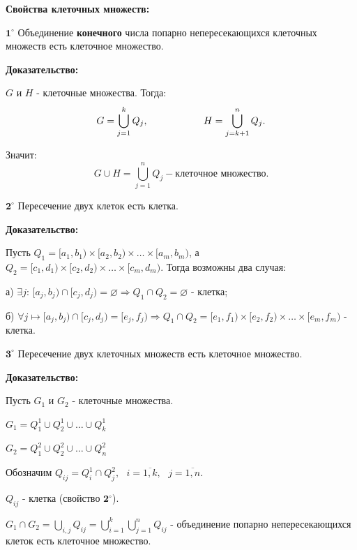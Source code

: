 \documentclass[a4paper,12pt]{article} %
\begin{document}
	\textbf{Свойства клеточных множеств:}
	
	$\textbf{1}^\circ$ Объединение \textbf{конечного} числа попарно непересекающихся клеточных множеств есть клеточное множество.
	
	\textbf{Доказательство:}
	
	$G$ и $H$ - клеточные множества. Тогда:
	\begin{equation*}
		G = \bigcup_{j = 1}^k Q_j, \hspace{20mm} H = \bigcup_{j = k + 1}^n Q_j.
	\end{equation*}
	
	Значит:
	\begin{equation*}
		G \cup H = \bigcup_{j = 1}^n Q_j - \text{клеточное множество}.
	\end{equation*}
	
	$\textbf{2}^\circ$ Пересечение двух клеток есть клетка.
	
	\textbf{Доказательство:} 
	
	Пусть $Q_1 = [a_1, b_1) \times [a_2, b_2) \times \dots \times [a_m, b_m)$, а $Q_2 = [c_1, d_1) \times [c_2, d_2) \times \dots \times [c_m, d_m)$. Тогда возможны два случая:
	
	а) $\exists j$: $[a_j, b_j) \cap [c_j, d_j) = \varnothing \Rightarrow Q_1 \cap Q_2 = \varnothing $ - клетка;
	
	б) $\forall j \longmapsto [a_j, b_j) \cap [c_j, d_j) = [e_j, f_j) \Rightarrow Q_1 \cap Q_2 = [e_1, f_1) \times [e_2, f_2) \times \ldots \times [e_m, f_m)$ - клетка.
	
	\vspace{5mm}
	
	$\textbf{3}^\circ$ Пересечение двух клеточных множеств есть клеточное множество.
	
	\textbf{Доказательство:}
	
	Пусть $G_1$ и $G_2$ - клеточные множества.
	
	$G_1 = Q_1^1 \cup Q_2^1 \cup \ldots \cup Q_k^1$
	
	$G_2 = Q_1^2 \cup Q_2^2 \cup \ldots \cup Q_n^2$
	
	Обозначим $Q_{ij} = Q_i^1 \cap Q_j^2, \text{ } i = \overline{1, k}, \text{ } j = \overline{1, n}.$
	
	$Q_{ij}$ - клетка (свойство $\textbf{2}^\circ$).
	
	$G_1 \cap G_2 = \bigcup\limits_{i, j} Q_{ij} = \bigcup\limits_{i = 1}^k \bigcup\limits_{j = 1}^n Q_{ij}$ - объединение попарно непересекающихся клеток есть клеточное множество.
	
\end{document}
